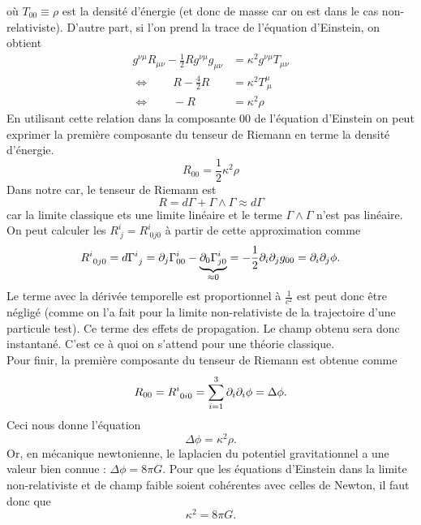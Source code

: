 \documentclass[a4paper,11pt]{report}
\begin{document}
            où $T_{00}\equiv\rho$ est la densité d'énergie (et donc de masse car on est dans le cas non-relativiste). D'autre part, si l'on prend la trace de l'équation d'Einstein, on obtient
            \begin{align}
                g^{\nu\mu}R_{\mu\nu} - \frac{1}{2}Rg^{\nu\mu}g_{\mu\nu} &= \kappa^2g^{\nu\mu}T_{\mu\nu}\\
                \Leftrightarrow \qquad R-\frac{4}{2}R &= \kappa^2 T^\mu_{~\mu}\\
                \Leftrightarrow\qquad -R &= \kappa^2 \rho
            \end{align}
            En utilisant cette relation dans la composante $00$ de l'équation d'Einstein on peut exprimer la première composante du tenseur de Riemann en terme la densité d'énergie.
            \begin{equation}
                R_{00} = \frac{1}{2}\kappa^2\rho
            \end{equation}
            Dans notre car, le tenseur de Riemann est 
            \begin{equation}
                R = d\Gamma + \Gamma\wedge\Gamma \approx d\Gamma
            \end{equation}
            car la limite classique ets une limite linéaire et le terme $\Gamma\wedge\Gamma$ n'est pas linéaire. On peut calculer les $R^i_{~j} = R^i_{~0j0}$ à partir de cette approximation comme
            \begin{align}
                R^i_{~0j0} =d\Gamma^i_{~j} = \partial_j\Gamma^i_{00}-\underbrace{\partial_0\Gamma^i_{j0}}_{\approx 0} = -\frac{1}{2}\partial_i\partial_j g_{00} = \partial_i\partial_j \phi.
            \end{align}
            Le terme avec la dérivée temporelle est proportionnel à $\frac{1}{c^2}$ est peut donc être négligé (comme on l'a fait pour la limite non-relativiste de la trajectoire d'une particule test). Ce terme des effets de propagation. Le champ obtenu sera donc instantané. C'est ce à quoi on s'attend pour une théorie classique.\\
            
            Pour finir, la première composante du tenseur de Riemann est obtenue comme
            \begin{equation}
                R_{00} = R^i_{~0i0} = \sum_{i=1}^3 \partial_i\partial_i \phi = \Delta\phi.
            \end{equation}
            Ceci nous donne l'équation
            \begin{equation}
                \Delta\phi = \kappa^2\rho.
            \end{equation}
            Or, en mécanique newtonienne, le laplacien du potentiel gravitationnel a une valeur bien connue : $\Delta\phi = 8\pi G$. Pour que les équations d'Einstein dans la limite non-relativiste et de champ faible soient cohérentes avec celles de Newton, il faut donc que
            \begin{equation}
                \kappa^2 = 8\pi G.
            \end{equation}
            
\end{document}
